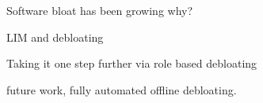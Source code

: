 Software bloat has been growing
why?

LIM and debloating

Taking it one step further via role based debloating

future work, fully automated offline debloating.